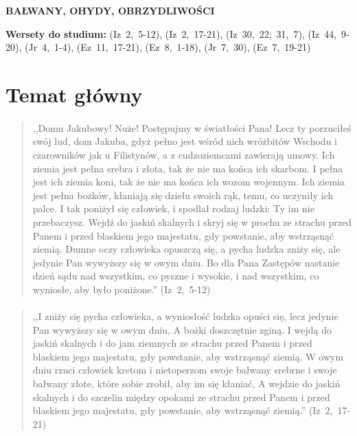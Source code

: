 \documentclass[10pt,a4paper,oneside]{article}
\begin{document}
\centerline{\textbf{\MakeUppercase{Bałwany, ohydy, obrzydliwości}}}
\begin{center}
\textbf{Wersety do studium:} \mbox{(Iz 2, 5-12)}, \mbox{(Iz 2, 17-21)}, \mbox{(Iz 30, 22; 31, 7)}, \mbox{(Iz 44, 9-20)}, \mbox{(Jr 4, 1-4)}, \mbox{(Ez 11, 17-21)}, \mbox{(Ez 8, 1-18)}, \mbox{(Jr 7, 30)}, \mbox{(Ez 7, 19-21)}
\end{center}
\section{Temat główny}
\paragraph{}
\begin{quote}
,,Domu Jakubowy! Nuże! Postępujmy w światłości Pana! Lecz ty porzuciłeś swój lud, dom Jakuba, gdyż pełno jest wśród nich wróżbitów Wschodu i czarowników jak u Filistynów, a z cudzoziemcami zawierają umowy. Ich ziemia jest pełna srebra i złota, tak że nie ma końca ich skarbom. I pełna jest ich ziemia koni, tak że nie ma końca ich wozom wojennym. Ich ziemia jest pełna bożków, kłaniają się dziełu swoich rąk, temu, co uczyniły ich palce. I tak poniżył się człowiek, i spodlał rodzaj ludzki: Ty im nie przebaczysz. Wejdź do jaskiń skalnych i skryj się w prochu ze strachu przed Panem i przed blaskiem jego majestatu, gdy powstanie, aby wstrząsnąć ziemią. Dumne oczy człowieka opuszczą się, a pycha ludzka zniży się, ale jedynie Pan wywyższy się w owym dniu. Bo dla Pana Zastępów nastanie dzień sądu nad wszystkim, co pyszne i wysokie, i nad wszystkim, co wyniosłe, aby było poniżone.'' \mbox{(Iz 2, 5-12)}
\end{quote}
\paragraph{}
\begin{quote}
,,I zniży się pycha człowieka, a wyniosłość ludzka opuści się, lecz jedynie Pan wywyższy się w owym dniu, A bożki doszczętnie zginą. I wejdą do jaskiń skalnych i do jam ziemnych ze strachu przed Panem i przed blaskiem jego majestatu, gdy powstanie, aby wstrząsnąć ziemią. W owym dniu rzuci człowiek kretom i nietoperzom swoje bałwany srebrne i swoje bałwany złote, które sobie zrobił, aby im się kłaniać, A wejdzie do jaskiń skalnych i do szczelin między opokami ze strachu przed Panem i przed blaskiem jego majestatu, gdy powstanie, aby wstrząsnąć ziemią.'' \mbox{(Iz 2, 17-21)}
\end{quote}
\end{document}
